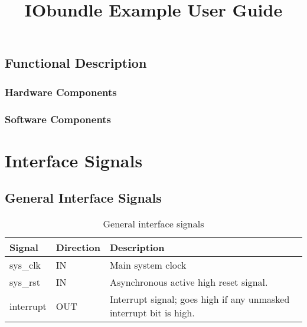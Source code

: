\documentclass{ug}
\title{IObundle Example User Guide}
\theoremstyle{plain}
\begin{document}
\maketitle
\cleardoublepage
\tableofcontents
\cleardoublepage
\listoftables
\cleardoublepage
\listoffigures
\cleardoublepage


\subsection{Functional Description}
\label{sec:func}

\subsubsection{Hardware Components}


\subsubsection{Software Components}


\section{Interface Signals}

\subsection{General Interface Signals}

\begin{table}[H]
  \begin{center}
    \begin{tabular}{|l|l|p{8cm}|}
      \hline
      \rowcolor{iob-green}
      \textbf{Signal} & \textbf{Direction} & \textbf{Description} \\
      \hline
      \hline

      sys\_clk &  IN & Main system clock \\
      \hline

      \rowcolor{iob-blue} sys\_rst & IN & Asynchronous active high reset
      signal. \\ \hline

      interrupt & OUT & Interrupt signal; goes high if any
      unmasked interrupt bit is high.\\ \hline

    \end{tabular}
    \caption{General interface signals}
    \label{tab:is}
  \end{center}
\end{table}
\end{document}
